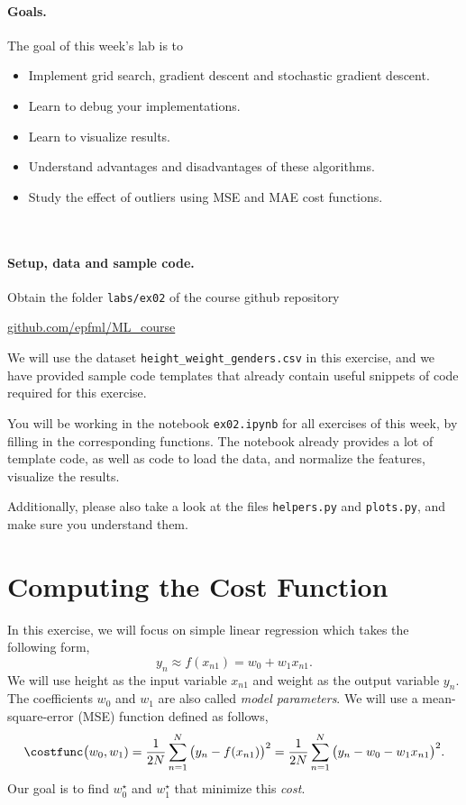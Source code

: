 \documentclass{../tex_import/ETHuebung_english}
\begin{document}

\paragraph{Goals.}
The goal of this week's lab is to
\begin{itemize}
\item Implement grid search, gradient descent and stochastic gradient descent.
\item Learn to debug your implementations.
\item Learn to visualize results.
\item Understand advantages and disadvantages of these algorithms.
\item Study the effect of outliers using MSE and MAE cost functions.
\end{itemize}
~\\

\paragraph{Setup, data and sample code.}
Obtain the folder {\tt labs/ex02} of the course github repository
\begin{center}
\href{https://github.com/epfml/ML\_course/tree/main/labs/ex02}{github.com/epfml/ML\_course}
\end{center}
We will use the dataset {\tt height\_weight\_genders.csv} in this exercise,
and we have provided sample code templates that already contain useful snippets of code
required for this exercise.

You will be working in the notebook {\tt ex02.ipynb} for all exercises of this week, by filling in the corresponding functions. The notebook already provides a lot of template code, as well as code to load the data, and normalize the features, visualize the results.

Additionally, please also take a look at the files {\tt helpers.py} and {\tt plots.py}, and make sure you understand them.


\section{Computing the Cost Function}
In this exercise, we will focus on simple linear regression which takes the following form,
\begin{equation}
y_n \approx f(x_{n1}) = w_0 + w_1 x_{n1}.
\label{eq:f}
\end{equation}
We will use height as the input variable $x_{n1}$ and weight as the output variable $y_n$.
The coefficients $w_0$ and $w_1$ are also called \emph{model parameters}.
We will use a mean-square-error (MSE) function defined as follows,
\begin{equation}
\costfunc \big( w_0, w_1)
= \frac{1}{2N} \sum_{n=1}^N\big(y_n - f(x_{n1}) \big)^2
= \frac{1}{2N} \sum_{n=1}^N\big(y_n - w_0 - w_1 x_{n1} \big)^2.
\label{eq:loss}
\end{equation}
Our goal is to find $w_0^\star$ and $w_1^\star$ that minimize this \emph{cost}.
\newline
\end{document}
